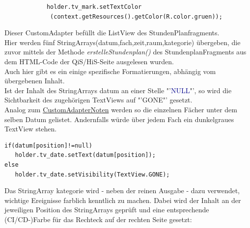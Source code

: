 \begin{description}
\begin{lstlisting}
            holder.tv_mark.setTextColor
             (context.getResources().getColor(R.color.gruen));
\end{lstlisting}
\newpage
{}
\label{CustomAdapterStundenplan}
Dieser CustomAdapter befüllt die ListView des StundenPlanfragments.\\
Hier werden fünf StringArrays(\textcolor{lila}{datum},\textcolor{lila}{fach},\textcolor{lila}{zeit},\textcolor{lila}{raum},\textcolor{lila}{kategorie}) übergeben, die zuvor mittels der Methode \textit{erstelleStundenplan()} des StundenplanFragments aus dem HTML-Code der QiS/HiS-Seite ausgelesen wurden.\\
Auch hier gibt es ein einige spezifische Formatierungen, abhängig vom übergebenen Inhalt.\\
Ist der Inhalt des StringArrays \textcolor{lila}{datum} an einer Stelle "'\textcolor{darkblue}{NULL}"', so wird die Sichtbarkeit des zugehörigen TextViews auf  "'\textcolor{lila}{GONE}"' gesetzt.\\
Analog zum \hyperref[CustomAdapterNoten]{CustomAdapterNoten} werden so die einzelnen Fächer unter dem selben Datum gelistet. Andernfalls würde über jedem Fach ein dunkelgraues TextView stehen.
\begin{lstlisting}
if(datum[position]!=null)
   holder.tv_date.setText(datum[position]);
else
   holder.tv_date.setVisibility(TextView.GONE);
\end{lstlisting}
Das StringArray \textcolor{lila}{kategorie} wird - neben der reinen Ausgabe - dazu verwendet, wichtige Ereignisse farblich kenntlich zu machen. Dabei wird der Inhalt an der jeweiligen Position des StringArrays geprüft und eine entsprechende (CI/CD-)Farbe für das Rechteck auf der rechten Seite gesetzt:


\end{description}

